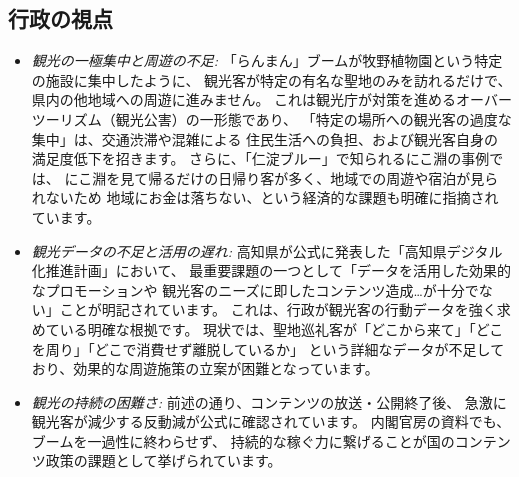 \documentclass{docs}
\begin{document}
\subsection{行政の視点}
\begin{itemize}
\item \emph{観光の一極集中と周遊の不足:}
	「らんまん」ブームが牧野植物園という特定の施設に集中したように、
	観光客が特定の有名な聖地のみを訪れるだけで、県内の他地域への周遊に進みません。
	これは観光庁が対策を進めるオーバーツーリズム（観光公害）の一形態\cite{kanko_overtourism}であり、
	「特定の場所への観光客の過度な集中」は、交通渋滞や混雑による
	住民生活への負担、および観光客自身の満足度低下を招きます。
	さらに、「仁淀ブルー」で知られるにこ淵の事例\cite{nikobuchi_mlit}では、
	にこ淵を見て帰るだけの日帰り客が多く、地域での周遊や宿泊が見られないため
	地域にお金は落ちない、という経済的な課題も明確に指摘されています。

	\item \emph{観光データの不足と活用の遅れ:}
	高知県が公式に発表した「高知県デジタル化推進計画」\cite{kochi_dx_plan}において、
	最重要課題の一つとして「データを活用した効果的なプロモーションや
	観光客のニーズに即したコンテンツ造成…が十分でない」ことが明記されています。
	これは、行政が観光客の行動データを強く求めている明確な根拠です。
	現状では、聖地巡礼客が「どこから来て」「どこを周り」「どこで消費せず離脱しているか」
	という詳細なデータが不足しており、効果的な周遊施策の立案が困難となっています。

	\item \emph{観光の持続の困難さ:}
	前述の通り、コンテンツの放送・公開終了後、
	急激に観光客が減少する反動減が公式に確認されています\cite{kochi_r7_plan}。
	内閣官房の資料\cite{cas_kadokawa}でも、ブームを一過性に終わらせず、
	持続的な稼ぐ力に繋げることが国のコンテンツ政策の課題として挙げられています。
\end{itemize}
\end{document}
